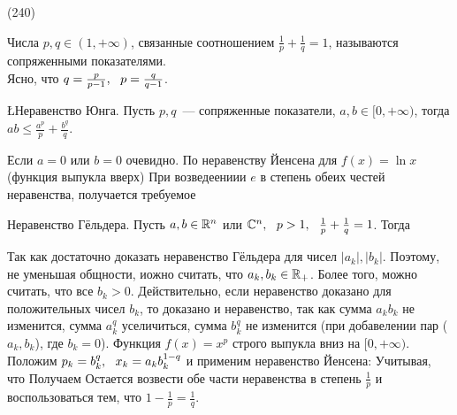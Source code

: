 (240)

\Op Числа $p, q \in (1, +\infty)$, связанные соотношением $\frac 1p + \frac 1q = 1$, называются сопряженными показателями.\\
Ясно, что $q = \frac{p}{p - 1},\ \  p = \frac q{q - 1}$.

\L \q Неравенство Юнга. Пусть $p, q$~--- сопряженные показатели, $a, b \in [0, +\infty)$, тогда $ab \le \frac{a^p}p + \frac{b^q}{q}$.

\D Если $a = 0$ или $b = 0$ очевидно. По неравенству Йенсена для $f(x) = \ln x$ (функция выпукла вверх)  При возведеениии $e$ в степень обеих честей неравенства, получается требуемое

\T \q Неравенство Гёльдера. Пусть $a, b \in\mathbb{R}^n$ или $\mathbb{C}^n,\ \  p > 1,\ \  \frac 1p + \frac 1q = 1$. Тогда 

\D Так как  достаточно доказать неравенство Гёльдера для чисел $|a_k|, |b_k|$. Поэтому, не уменьшая общности, иожно считать, что $a_k, b_k \in \mathbb{R}_+$. Более того, можно считать, что все $b_k > 0$. Действительно, если неравенство доказано для положительных чисел $b_k$, то доказано и неравенство, так как сумма $a_k b_k$ не изменится, сумма $a^q_k$ уселичиться, сумма $b^q_k$ не изменится (при добавелении пар ($a_k, b_k$), где $b_k = 0$).
Функция $f(x) = x^p$ строго выпукла вниз на $[0, +\infty)$. Положим $p_k = b^q_k,\ \  x_k = a_k b^{1-q}_k$ и применим неравенство Йенсена:  Учитывая, что  Получаем  Остается возвести обе части неравенства в степень $\frac 1p$ и воспользоваться тем, что $1 - \frac 1p = \frac 1q$.